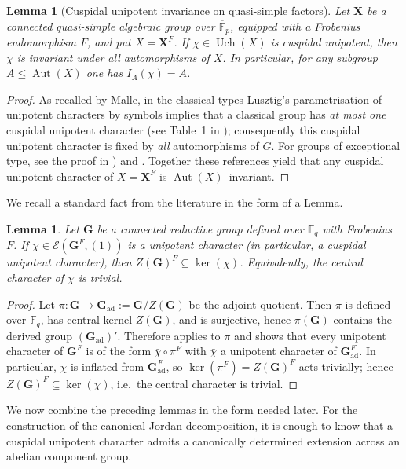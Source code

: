 \documentclass{amsart}
\theoremstyle{plain}
\numberwithin{equation}{section}
\newtheorem{lemma}[theorem]{Lemma}
\theoremstyle{definition}
\newcommand{\cE}{\mathcal{E}}
\newcommand{\Uch}{\operatorname{Uch}}
\newcommand{\ad}{\operatorname{ad}}
\newcommand{\Aut}{\operatorname{Aut}}
\begin{document}
\begin{lemma}[Cuspidal unipotent invariance on quasi-simple factors]\label{lem:cuspidal-unipotent-invariant}
Let \(\mathbf X\) be a connected quasi-simple algebraic group over
\(\overline{\mathbb F}_p\), equipped with a Frobenius endomorphism \(F\), and
put \(X=\mathbf X^F\). If $\chi\in\Uch(X)$ is cuspidal unipotent, then $\chi$ is invariant under all automorphisms of $X$.
In particular, for any subgroup $A\le \Aut(X)$ one has $I_A(\chi)=A$.
\end{lemma}

\begin{proof}
As recalled by Malle, in the classical types Lusztig’s parametrisation of unipotent characters by
symbols implies that a classical group has \emph{at most one} cuspidal unipotent character (see
Table~1 in \cite[\S2.1]{Malle2017}); consequently this cuspidal unipotent character is fixed
by \emph{all} automorphisms of $G$.
For groups of exceptional type, see the proof in \cite[Thm.~ 3.2]{Malle2017})  and \cite[Thm.~2.5]{Malle08}.
Together these references yield that any cuspidal unipotent character of $X=\mathbf X^F$ is
$\Aut(X)$--invariant.

\end{proof}

We recall a standard fact from the literature in the form of a Lemma.
\begin{lemma}\label{lem:unipotent-trivial-central-character}
Let $\mathbf G$ be a connected reductive group defined over $\mathbb F_q$ with Frobenius $F$.
If $\chi\in\cE(\mathbf G^F,(1))$ is a unipotent character (in particular, a cuspidal unipotent
character), then $Z(\mathbf G)^F\subseteq\ker(\chi)$. Equivalently, the central character of $\chi$
is trivial.
\end{lemma}

\begin{proof}
Let $\pi:\mathbf G\to \mathbf G_{\ad}:=\mathbf G/Z(\mathbf G)$ be the adjoint quotient.  Then $\pi$
is defined over $\mathbb F_q$, has central kernel $Z(\mathbf G)$, and is surjective, hence
$\pi(\mathbf G)$ contains the derived group $(\mathbf G_{\ad})'$.
Therefore \cite[Prop.~13.20]{Book:DigneandMichel} applies to $\pi$ and shows that every unipotent character of
$\mathbf G^F$ is of the form $\bar\chi\circ \pi^F$ with $\bar\chi$ a unipotent character of
$\mathbf G_{\ad}^F$.
In particular, $\chi$ is inflated from $\mathbf G_{\ad}^F$, so $\ker(\pi^F)=Z(\mathbf G)^F$
acts trivially; hence $Z(\mathbf G)^F\subseteq\ker(\chi)$, i.e.\ the central character is trivial.
\end{proof}
We now combine the preceding lemmas in the form needed later. For the construction of the
canonical Jordan decomposition, it is enough to know that a cuspidal unipotent character admits a
canonically determined extension across an abelian component group.
\end{document}
